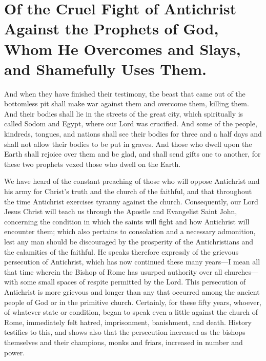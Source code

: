 \chapter[Sermon 48. Of the Cruel Fight of Antichrist Against the Prophets of God, Whom He Overcomes and Slays, and Shamefully Uses Them.]{Of the Cruel Fight of Antichrist Against the Prophets of God, Whom He Overcomes and Slays, and Shamefully Uses Them.}
\label{sermon:048}

And when they have finished their testimony, the beast that came out of the bottomless pit shall make war against them and overcome them, killing them. And their bodies shall lie in the streets of the great city, which spiritually is called Sodom and Egypt, where our Lord was crucified. And some of the people, kindreds, tongues, and nations shall see their bodies for three and a half days and shall not allow their bodies to be put in graves. And those who dwell upon the Earth shall rejoice over them and be glad, and shall send gifts one to another, for these two prophets vexed those who dwell on the Earth.

We have heard of the constant preaching of those who will oppose Antichrist and his army for Christ’s truth and the church of the faithful, and that throughout the time Antichrist exercises tyranny against the church. Consequently, our Lord Jesus Christ will teach us through the Apostle and Evangelist Saint John, concerning the condition in which the saints will fight and how Antichrist will encounter them; which also pertains to consolation and a necessary admonition, lest any man should be discouraged by the prosperity of the Antichristians and the calamities of the faithful. He speaks therefore expressly of the grievous persecution of Antichrist, which has now continued these many years—I mean all that time wherein the Bishop of Rome has usurped authority over all churches—with some small spaces of respite permitted by the Lord. This persecution of Antichrist is more grievous and longer than any that occurred among the ancient people of God or in the primitive church. Certainly, for these fifty years, whoever, of whatever state or condition, began to speak even a little against the church of Rome, immediately felt hatred, imprisonment, banishment, and death. History testifies to this, and shows also that the persecution increased as the bishops themselves and their champions, monks and friars, increased in number and power.

